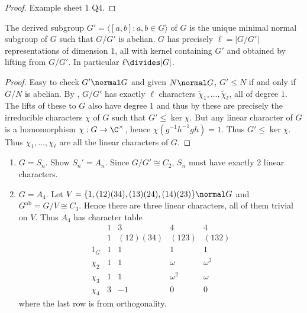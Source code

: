 \documentclass[a4paper]{article}
\begin{document}
\begin{proof}
  Example sheet 1 Q4.
\end{proof}

\begin{lemma}
  The derived subgroup \(G' = \langle [a, b]: a, b \in G \rangle\) of \(G\) is the unique minimal normal subgroup of \(G\) such that \(G/G'\) is abelian. \(G\) has precisely \(\ell = |G/G'|\) representations of dimension \(1\), all with kernel containing \(G'\) and obtained by lifting from \(G/G'\). In particular \(\ell \divides |G|\).
\end{lemma}

\begin{proof}
  Easy to check \(G' \normal G\) and given \(N \normal G\), \(G' \leq N\) if and only if \(G/N\) is abelian. By , \(G/G'\) has exactly \(\ell\) characters \(\tilde \chi_1, \dots, \tilde \chi_\ell\), all of degree \(1\). The lifts of these to \(G\) also have degree \(1\) and thus by  these are precisely the irreducible characters \(\chi\) of \(G\) such that \(G' \leq \ker \chi\). But any linear character of \(G\) is a homomorphism \(\chi: G \to \C^\times\), hence \(\chi(g^{-1}h^{-1}gh) = 1\). Thus \(G' \leq \ker \chi\). Thus \(\chi_1, \dots, \chi_\ell\) are all the linear characters of \(G\).
\end{proof}

\begin{eg}\leavevmode
  \begin{enumerate}
  \item \(G = S_n\). Show \(S_n' = A_n\). Since \(G/G' \cong C_2\), \(S_n\) must have exactly 2 linear characters.
  \item \(G = A_4\). Let \(V = \{1, (12)(34), (13)(24), (14)(23)\} \normal G\) and \(G^{\text{ab}} = G/V \cong C_3\). Hence there are three linear characters, all of them trivial on \(V\). Thus \(A_4\) has character table
    \[
      \begin{array}{r|c|c|c|c}
        & 1 & 3 & 4 & 4 \\
        & 1 & (12)(34) & (123) & (132) \\ \hline
        1_G & 1 & 1 & 1 & 1 \\
        \chi_2 & 1 & 1 & \omega & \omega^2 \\
        \chi_3 & 1 & 1 & \omega^2 & \omega \\
        \chi_4 & 3 & -1 & 0 & 0
      \end{array}
    \]
    where the last row is from orthogonality.
  \end{enumerate}
\end{eg}
\end{document}
